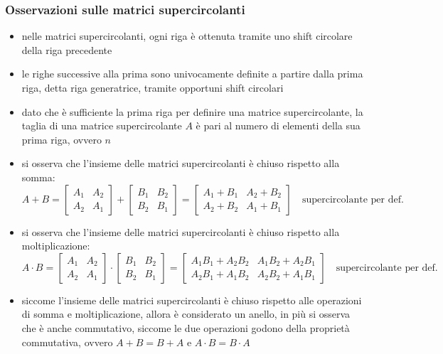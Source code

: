\subsubsection*{Osservazioni sulle matrici supercircolanti}
\begin{itemize}
	\item nelle matrici supercircolanti, ogni riga è ottenuta tramite uno shift circolare della riga precedente
	\item le righe successive alla prima sono univocamente definite a partire dalla prima riga, detta riga generatrice,
	tramite opportuni shift circolari
	\item dato che è sufficiente la prima riga per definire una matrice supercircolante, la taglia di una matrice
	supercircolante \(A\) è pari al numero di elementi della sua prima riga, ovvero \(n\)
	\item si osserva che l'insieme delle matrici supercircolanti è chiuso rispetto alla somma:
	\[A + B = \begin{bmatrix} A_1 & A_2 \\ A_2 & A_1 \end{bmatrix} + \begin{bmatrix} B_1 & B_2 \\ B_2 & B_1 \end{bmatrix} = \begin{bmatrix} A_1 + B_1 & A_2 + B_2 \\ A_2 + B_2 & A_1 + B_1 \end{bmatrix} \quad \text{supercircolante per def.}\]
	\item si osserva che l'insieme delle matrici supercircolanti è chiuso rispetto alla moltiplicazione:
	\[A \cdot B = \begin{bmatrix} A_1 & A_2 \\ A_2 & A_1 \end{bmatrix} \cdot \begin{bmatrix} B_1 & B_2 \\ B_2 & B_1 \end{bmatrix} = \begin{bmatrix} A_1 B_1 + A_2 B_2 & A_1 B_2 + A_2 B_1 \\ A_2 B_1 + A_1 B_2 & A_2 B_2 + A_1 B_1 \end{bmatrix} \quad \text{supercircolante per def.}\]
	\item siccome l'insieme delle matrici supercircolanti è chiuso rispetto alle operazioni di somma e moltiplicazione, allora
	è considerato un anello, in più si osserva che è anche commutativo, siccome le due operazioni godono della proprietà
	commutativa, ovvero \(A + B = B + A\) e \(A \cdot B = B \cdot A\)
\end{itemize}

